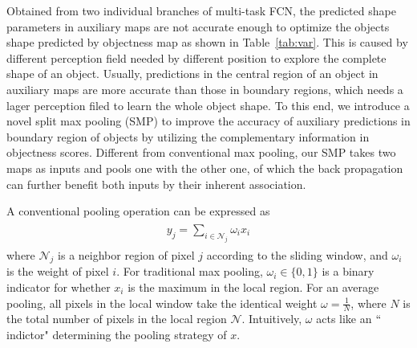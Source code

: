 Obtained from two individual branches of multi-task FCN, the predicted shape parameters in auxiliary maps are not accurate enough to optimize the objects shape predicted by objectness map as shown in Table~\ref{tab:var}.
This is caused by different perception field needed by different position to explore the complete shape of an object.
Usually, predictions in the central region of an object in auxiliary maps are more accurate than those in boundary regions, which needs a lager perception filed to learn the whole object shape.
To this end, we introduce a novel split max pooling (SMP) to improve the accuracy of auxiliary predictions in boundary region of objects by utilizing the complementary information in objectness scores.
Different from conventional max pooling, our SMP takes two maps as inputs and pools one with the other one, of which the back propagation can further benefit both inputs by their inherent association.

A conventional pooling operation can be expressed as
\begin{eqnarray}\label{pooling}
\begin{aligned}
y_{j} = \sum_{i\in \mathcal{N}_{j}} \omega_{i}x_{i}
\end{aligned}
\end{eqnarray}
where $\mathcal{N}_{j}$ is a neighbor region of pixel $j$ according to the sliding window, and $\omega_{i}$ is the weight of pixel $i$.
For traditional max pooling, $\omega_i \in \{0,1\}$ is a binary indicator for whether $x_i$ is the maximum in the local region.
For an average pooling, all pixels in the local window take the identical weight $\omega=\frac{1}{N}$, where $N$ is the total number of pixels in the local region $\mathcal{N}$.
Intuitively, $\omega$ acts like an $``$indictor" determining the pooling strategy of $x$.

